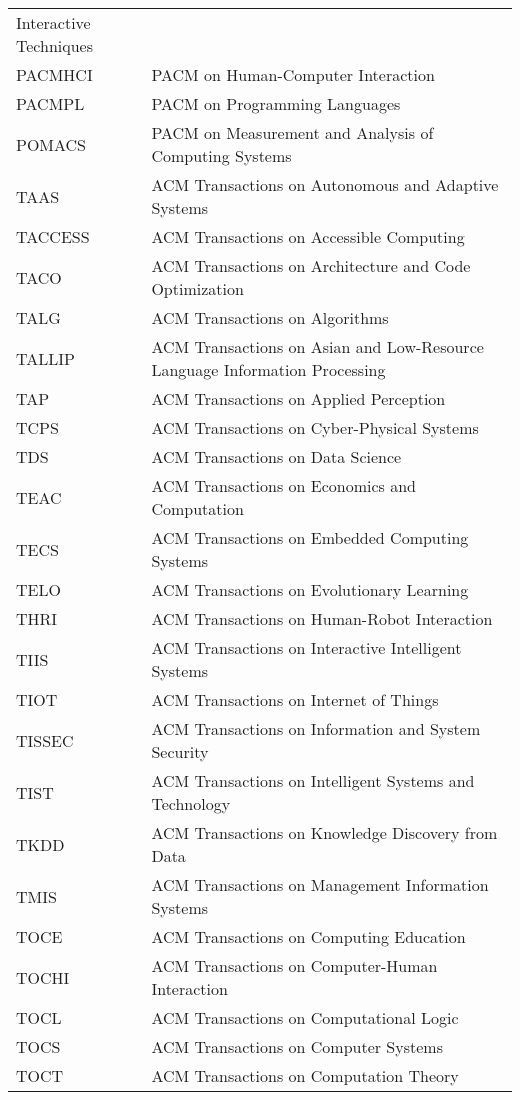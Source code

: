 \begin{longtable}{>{\ttfamily}p{}@{}p{}}
     Interactive Techniques\\
     PACMHCI & PACM on Human-Computer Interaction\\
     PACMPL & PACM on Programming Languages \\
     POMACS & PACM on Measurement and Analysis of Computing Systems \\
     TAAS & ACM Transactions on Autonomous and Adaptive Systems\\
     TACCESS & ACM Transactions on Accessible Computing\\
     TACO & ACM Transactions on Architecture and Code Optimization \\
     TALG & ACM Transactions on Algorithms \\
     TALLIP & ACM Transactions on Asian and Low-Resource Language
     Information Processing\\
     TAP & ACM Transactions on Applied Perception \\
     TCPS & ACM Transactions on Cyber-Physical Systems\\
     TDS & ACM Transactions on Data Science\\
     TEAC & ACM Transactions on Economics and Computation\\
     TECS & ACM Transactions on Embedded Computing Systems \\
     TELO & ACM Transactions on Evolutionary Learning \\
     THRI & ACM Transactions on Human-Robot Interaction\\
     TIIS & ACM Transactions on Interactive Intelligent Systems\\
     TIOT & ACM Transactions on Internet of Things \\
     TISSEC & ACM Transactions on Information and System Security\\
     TIST & ACM Transactions on Intelligent Systems and Technology \\
     TKDD & ACM Transactions on Knowledge Discovery from Data\\
     TMIS & ACM Transactions on Management Information Systems\\
     TOCE & ACM Transactions on Computing Education\\
     TOCHI & ACM Transactions on Computer-Human Interaction\\
     TOCL & ACM Transactions on Computational Logic\\
     TOCS & ACM Transactions on Computer Systems \\
     TOCT & ACM Transactions on Computation Theory \\

\end{longtable}
